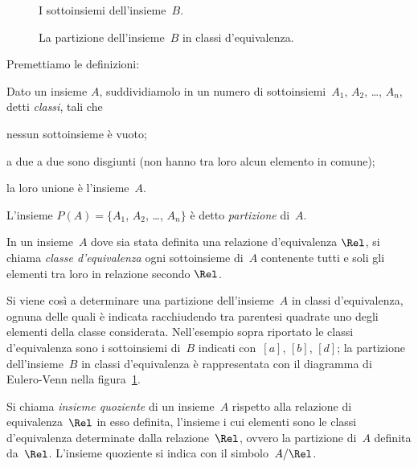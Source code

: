 \begin{figure}[ht]
\begin{minipage}[t]{.45\textwidth}
 \centering
 
 \caption{I sottoinsiemi dell'insieme~$B$.}\label{fig:B.9}
\end{minipage}\hfil
\begin{minipage}[t]{.45\textwidth}
 \centering
 
 \caption{La partizione dell'insieme~$B$ in classi d'equivalenza.}\label{fig:B.10}
\end{minipage}
\end{figure}
\pagebreak
Premettiamo le definizioni:

\begin{definizione}
Dato un insieme $A$, suddividiamolo in un numero di sottoinsiemi~$A_1$, $A_2$, \ldots, $A_n$, detti \emph{classi}, tali che
\begin{enumeratea}
\item nessun sottoinsieme è vuoto;
\item a due a due sono disgiunti (non hanno tra loro alcun elemento in comune);
\item la loro unione è l'insieme~$A$.
\end{enumeratea}
L'insieme $P(A) = \{A_1$, $A_2$, \ldots, $A_n\}$ è detto \emph{partizione} di~$A$.
\end{definizione}

\begin{definizione}
In un insieme~$A$ dove sia stata definita una relazione d'equivalenza $\Rel$, si chiama \emph{classe d'equivalenza} ogni sottoinsieme di~$A$ contenente tutti e soli gli elementi
tra loro in relazione secondo $\Rel$.
\end{definizione}

Si viene così a determinare una partizione dell'insieme~$A$ in classi d'equivalenza, ognuna delle quali è indicata racchiudendo tra parentesi quadrate
uno degli elementi della classe considerata.
Nell'esempio sopra riportato le classi d'equivalenza sono i sottoinsiemi di~$B$ indicati con~$[a]$, $[b]$, $[d]$; la
partizione dell'insieme~$B$ in classi d'equivalenza è rappresentata con il diagramma di Eulero-Venn nella figura~\ref{fig:B.10}.

\begin{definizione}
Si chiama \emph{insieme quoziente} di un insieme~$A$ rispetto alla relazione di equivalenza~$\Rel$ in esso definita,
l'insieme i cui elementi sono le classi d'equivalenza determinate dalla relazione~$\Rel$, ovvero la partizione di~$A$ definita da~$\Rel$. L'insieme quoziente si indica con il simbolo~$A/\Rel$.
\end{definizione}

